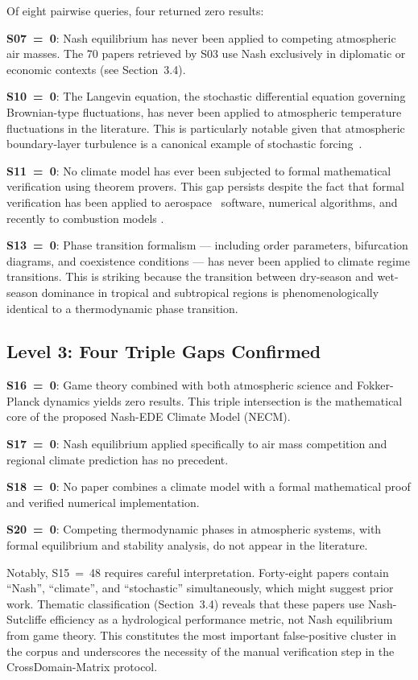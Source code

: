 \documentclass[12pt,a4paper]{article}
\begin{document}
Of eight pairwise queries, four returned zero results:

\textbf{S07~=~0}: Nash equilibrium has never been applied to competing
atmospheric air masses. The 70 papers retrieved by S03 use Nash
exclusively in diplomatic or economic contexts (see Section~3.4).

\textbf{S10~=~0}: The Langevin equation, the stochastic differential
equation governing Brownian-type fluctuations, has never been applied
to atmospheric temperature fluctuations in the literature. This is
particularly notable given that atmospheric boundary-layer turbulence
is a canonical example of stochastic forcing~\citep{Hasselmann1976}.

\textbf{S11~=~0}: No climate model has ever been subjected to formal
mathematical verification using theorem provers. This gap persists
despite the fact that formal verification has been applied to aerospace~\citep{ModelChecking2018}
software, numerical algorithms, and recently to combustion models
\citep{LeanFour2021}.

\textbf{S13~=~0}: Phase transition formalism — including order parameters,
bifurcation diagrams, and coexistence conditions — has never been applied
to climate regime transitions. This is striking because the transition
between dry-season and wet-season dominance in tropical and subtropical
regions is phenomenologically identical to a thermodynamic phase transition.

\subsection{Level 3: Four Triple Gaps Confirmed}

\textbf{S16~=~0}: Game theory combined with both atmospheric science and
Fokker-Planck dynamics yields zero results. This triple intersection
is the mathematical core of the proposed Nash-EDE Climate Model (NECM).

\textbf{S17~=~0}: Nash equilibrium applied specifically to air mass
competition and regional climate prediction has no precedent.

\textbf{S18~=~0}: No paper combines a climate model with a formal
mathematical proof and verified numerical implementation.

\textbf{S20~=~0}: Competing thermodynamic phases in atmospheric systems,
with formal equilibrium and stability analysis, do not appear in the
literature.

Notably, S15~=~48 requires careful interpretation. Forty-eight papers
contain ``Nash'', ``climate'', and ``stochastic'' simultaneously, which
might suggest prior work. Thematic classification (Section~3.4) reveals
that these papers use Nash-Sutcliffe efficiency as a hydrological
performance metric, not Nash equilibrium from game theory. This
constitutes the most important false-positive cluster in the corpus and
underscores the necessity of the manual verification step in the
CrossDomain-Matrix protocol.
\end{document}
